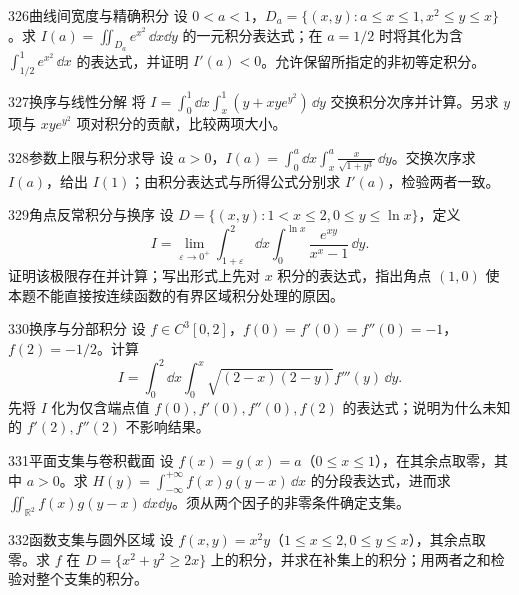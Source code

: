 \begin{exercise}{326}{曲线间宽度与精确积分}
设 $0<a<1$，$D_a=\{(x,y):a\leq x\leq1,x^2\leq y\leq x\}$。求 $I(a)=\iint_{D_a}e^{x^2}\,\dd x\dd y$ 的一元积分表达式；在 $a=1/2$ 时将其化为含 $\int_{1/2}^1e^{x^2}\,\dd x$ 的表达式，并证明 $I'(a)<0$。允许保留所指定的非初等定积分。
\end{exercise}

\begin{exercise}{327}{换序与线性分解}
将 $I=\int_0^1\dd x\int_x^1(y+xye^{y^2})\,\dd y$ 交换积分次序并计算。另求 $y$ 项与 $xye^{y^2}$ 项对积分的贡献，比较两项大小。
\end{exercise}

\begin{exercise}{328}{参数上限与积分求导}
设 $a>0$，$I(a)=\int_0^a\dd x\int_x^a\frac{x}{\sqrt{1+y^3}}\,\dd y$。交换次序求 $I(a)$，给出 $I(1)$；由积分表达式与所得公式分别求 $I'(a)$，检验两者一致。
\end{exercise}

\begin{exercise}{329}{角点反常积分与换序}
设 $D=\{(x,y):1<x\leq2,0\leq y\leq\ln x\}$，定义
\[
 I=\lim_{\varepsilon\to0^+}\int_{1+\varepsilon}^2\dd x\int_0^{\ln x}\frac{e^{xy}}{x^x-1}\,\dd y.
\]
证明该极限存在并计算；写出形式上先对 $x$ 积分的表达式，指出角点 $(1,0)$ 使本题不能直接按连续函数的有界区域积分处理的原因。
\end{exercise}

\begin{exercise}{330}{换序与分部积分}
设 $f\in C^3[0,2]$，$f(0)=f'(0)=f''(0)=-1$，$f(2)=-1/2$。计算
\[
 I=\int_0^2\dd x\int_0^x\sqrt{(2-x)(2-y)}f'''(y)\,\dd y.
\]
先将 $I$ 化为仅含端点值 $f(0),f'(0),f''(0),f(2)$ 的表达式；说明为什么未知的 $f'(2),f''(2)$ 不影响结果。
\end{exercise}

\begin{exercise}{331}{平面支集与卷积截面}
设 $f(x)=g(x)=a$（$0\leq x\leq1$），在其余点取零，其中 $a>0$。求
$H(y)=\int_{-\infty}^{+\infty}f(x)g(y-x)\,\dd x$ 的分段表达式，进而求 $\iint_{\mathbb R^2}f(x)g(y-x)\,\dd x\dd y$。须从两个因子的非零条件确定支集。
\end{exercise}

\begin{exercise}{332}{函数支集与圆外区域}
设 $f(x,y)=x^2y$（$1\leq x\leq2,0\leq y\leq x$），其余点取零。求 $f$ 在 $D=\{x^2+y^2\geq2x\}$ 上的积分，并求在补集上的积分；用两者之和检验对整个支集的积分。
\end{exercise}

